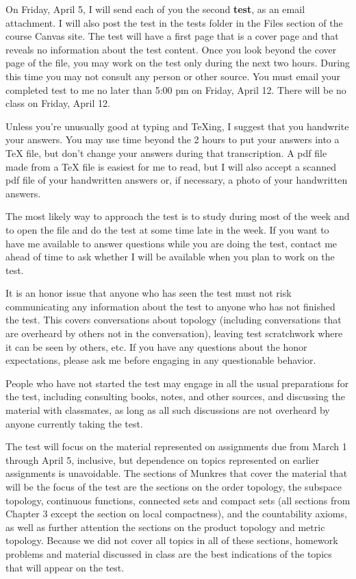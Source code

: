 \documentclass{amsart}
\theoremstyle{plain}
\theoremstyle{definition}
\theoremstyle{remark}
\begin{document}
\vspace{.45in}
On Friday, April 5, I will send each of you the second {\bfseries test}, as an email attachment. I will also post the test in the tests folder in the Files section of the course Canvas site. The test will have a first page that is a cover page and that reveals no information about the test content.   Once you look beyond the cover page of the file, you may work on the test only during the next two hours.  During this time you may not consult any person or other source.  You must email your completed test to me 
no later than 5:00 pm on Friday, April 12.  There will be no class 
on Friday, April 12.  

Unless you're unusually good at typing and TeXing, I suggest that you handwrite your answers. You may use time beyond the 2 hours to put your answers into a TeX file, but don't change your answers during that transcription. A pdf file made from a TeX file is easiest for me to read, but I will also accept a scanned pdf file of your handwritten answers or, if necessary, a photo of your handwritten answers.

The most likely way to approach the test is to study during most of 
the week and to open the file and do the test at some time late in the week.  If you want to have me available to answer questions while you are doing the test, contact me ahead of time to ask whether I will be available when you plan to work on the test. 

It is an honor issue that anyone who has seen the test must not risk 
communicating any information about the test to anyone who has not 
finished the test.  This covers conversations about topology   
(including conversations that are overheard by others not in the 
conversation), leaving test scratchwork where it can be seen by others, etc.  If you have 
any questions about the honor expectations, please ask me before 
engaging in any questionable behavior.  

People who have not started the test may engage in all the usual 
preparations for the test, including consulting books, notes, and 
other sources, and discussing the material with classmates, as long as 
all such discussions are not overheard by anyone currently taking the 
test.

The test will focus on the material represented on assignments due from March 1 through April 5, inclusive, but dependence on topics represented on earlier assignments is unavoidable.  The sections of Munkres that cover the material that will be the focus of the test are the sections on the order topology, the subspace topology, continuous functions, connected sets and compact sets (all sections from Chapter 3 except the section on local compactness), and the countability axioms, as well as further attention the sections on the product topology and metric topology. Because we did not cover all topics in all of these sections, homework problems and material discussed in class are the best indications of the topics that will appear on the test. 




 
\end{document}
